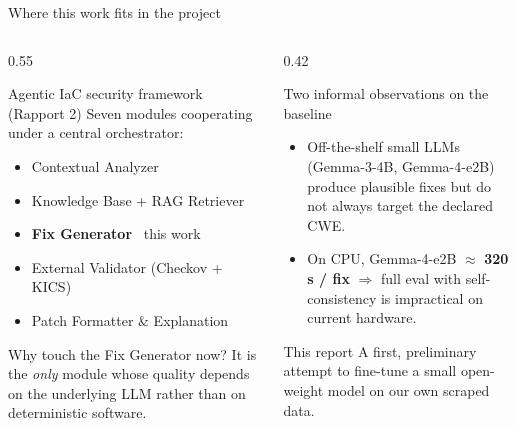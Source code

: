 \documentclass[aspectratio=169, 10pt]{beamer}
\begin{document}
\begin{frame}{Where this work fits in the project}
  \begin{columns}[T]
    \begin{column}{0.55\textwidth}
      \begin{block}{Agentic IaC security framework (Rapport 2)}
        Seven modules cooperating under a central orchestrator:
        \begin{itemize}\scriptsize
          \item Contextual Analyzer
          \item Knowledge Base + RAG Retriever
          \item \textbf{Fix Generator} \faArrowRight\ this work
          \item External Validator (Checkov + KICS)
          \item Patch Formatter \& Explanation
        \end{itemize}
      \end{block}
      \begin{alertblock}{Why touch the Fix Generator now?}
        \scriptsize
        It is the \emph{only} module whose quality depends on the
        underlying LLM rather than on deterministic software.
      \end{alertblock}
    \end{column}
    \begin{column}{0.42\textwidth}
      \begin{exampleblock}{Two informal observations on the baseline}
        \scriptsize
        \begin{itemize}
          \item Off-the-shelf small LLMs (Gemma-3-4B, Gemma-4-e2B)
                produce plausible fixes but do not always target the
                declared CWE.
          \item On CPU, Gemma-4-e2B $\approx$ \textbf{320 s / fix}
                $\Rightarrow$ full eval with self-consistency is
                impractical on current hardware.
        \end{itemize}
      \end{exampleblock}
      \begin{block}{This report}
        \scriptsize
        A first, preliminary attempt to fine-tune a small open-weight
        model on our own scraped data.
      \end{block}
    \end{column}
  \end{columns}
\end{frame}
\end{document}
